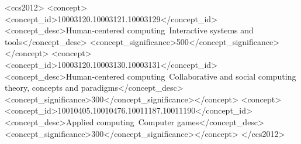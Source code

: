 \documentclass[sigconf,nonacm]{acmart}
\begin{document}
\begin{CCSXML}
<ccs2012>
<concept><concept_id>10003120.10003121.10003129</concept_id>
<concept_desc>Human-centered computing~Interactive systems and tools</concept_desc>
<concept_significance>500</concept_significance></concept>
<concept><concept_id>10003120.10003130.10003131</concept_id>
<concept_desc>Human-centered computing~Collaborative and social computing theory, concepts and paradigms</concept_desc>
<concept_significance>300</concept_significance></concept>
<concept><concept_id>10010405.10010476.10011187.10011190</concept_id>
<concept_desc>Applied computing~Computer games</concept_desc>
<concept_significance>300</concept_significance></concept>
</ccs2012>
\end{CCSXML}

\end{document}
